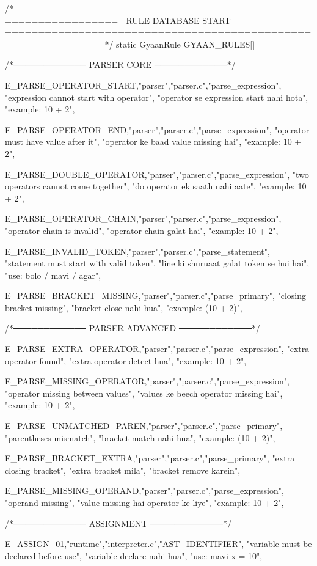 \documentclass{article}
\begin{document}
/*=============================================================
  🧠 RULE DATABASE START
=============================================================*/
static GyaanRule GYAAN_RULES[] = {

/*──────────── PARSER CORE ────────────*/

{E_PARSE_OPERATOR_START,"parser","parser.c","parse_expression",
"expression cannot start with operator",
"operator se expression start nahi hota",
"example: 10 + 2"},

{E_PARSE_OPERATOR_END,"parser","parser.c","parse_expression",
"operator must have value after it",
"operator ke baad value missing hai",
"example: 10 + 2"},

{E_PARSE_DOUBLE_OPERATOR,"parser","parser.c","parse_expression",
"two operators cannot come together",
"do operator ek saath nahi aate",
"example: 10 + 2"},

{E_PARSE_OPERATOR_CHAIN,"parser","parser.c","parse_expression",
"operator chain is invalid",
"operator chain galat hai",
"example: 10 + 2"},

{E_PARSE_INVALID_TOKEN,"parser","parser.c","parse_statement",
"statement must start with valid token",
"line ki shuruaat galat token se hui hai",
"use: bolo / mavi / agar"},

{E_PARSE_BRACKET_MISSING,"parser","parser.c","parse_primary",
"closing bracket missing",
"bracket close nahi hua",
"example: (10 + 2)"},

/*──────────── PARSER ADVANCED ────────────*/

{E_PARSE_EXTRA_OPERATOR,"parser","parser.c","parse_expression",
"extra operator found",
"extra operator detect hua",
"example: 10 + 2"},

{E_PARSE_MISSING_OPERATOR,"parser","parser.c","parse_expression",
"operator missing between values",
"values ke beech operator missing hai",
"example: 10 + 2"},

{E_PARSE_UNMATCHED_PAREN,"parser","parser.c","parse_primary",
"parentheses mismatch",
"bracket match nahi hua",
"example: (10 + 2)"},

{E_PARSE_BRACKET_EXTRA,"parser","parser.c","parse_primary",
"extra closing bracket",
"extra bracket mila",
"bracket remove karein"},

{E_PARSE_MISSING_OPERAND,"parser","parser.c","parse_expression",
"operand missing",
"value missing hai operator ke liye",
"example: 10 + 2"},

/*──────────── ASSIGNMENT ────────────*/

{E_ASSIGN_01,"runtime","interpreter.c","AST_IDENTIFIER",
"variable must be declared before use",
"variable declare nahi hua",
"use: mavi x = 10"},

}
\end{document}
